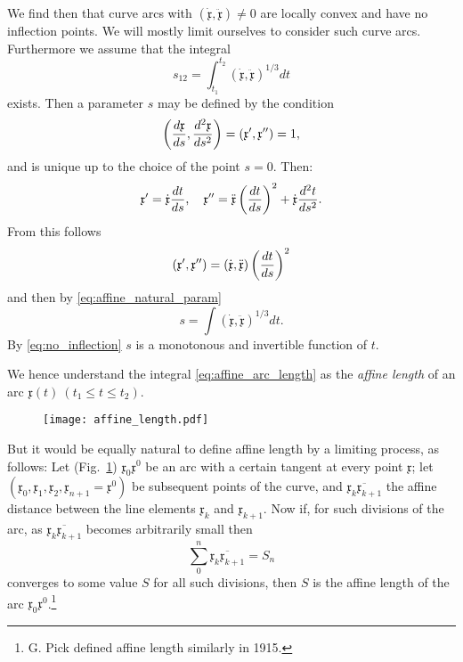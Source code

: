 \documentclass[11pt]{book} \usepackage{amssymb}
\newcommand{\myvec}[1]{\mathfrak{#1}}
\newcommand{\vecx}{\myvec{x}}
\newcommand{\vecderiv}[1]{\dot{\myvec{#1}}}
\newcommand{\vecderivv}[1]{\ddot{\myvec{#1}}}
\begin{document}
We find then that curve arcs with $(\vecderiv{x},\vecderivv{x})\neq 0$ are 
locally convex and have no inflection points. We will mostly limit ourselves
to consider such curve arcs. Furthermore we assume that the integral
\begin{equation}
  \label{eq:affine_arc_length}
  s_{12}=\int_{t_1}^{t_2}(\vecderiv{x},\vecderivv{x})^{1/3}dt
\end{equation}
exists. Then a parameter $s$ may be defined by the condition
\begin{equation}
  \label{eq:affine_natural_param}
  \left({d\vecx\over ds},{d^2\vecx\over ds^2}\right)=
  (\vecx',\vecx'')=1,
\end{equation}
and is unique up to the choice of the point $s=0$. Then:
\begin{equation}
  \label{eq:param_transform}
  \vecx'=\vecderiv{x}{dt\over ds},\quad 
  \vecx''=\vecderivv{x}\left({dt\over ds}\right)^2+\vecderiv{x}{d^2t\over ds^2}.
\end{equation}
From this follows
\begin{equation}
  \label{eq:affine_deriv_transform1}
  (\vecx',\vecx'')=(\vecderiv{x},\vecderivv{x})\left({}dt\over ds\right)^2
\end{equation}
and then by \eqref{eq:affine_natural_param}
\begin{equation}
  \label{eq:affine_arc_length2}
  s=\int(\vecderiv{x},\vecderivv{x})^{1/3}dt.
\end{equation}
By \eqref{eq:no_inflection} $s$ is a monotonous and invertible function of $t$.

We hence understand the integral \eqref{eq:affine_arc_length} as the 
{\em affine length} of an arc $\vecx(t)\:(t_1\leq t \leq t_2)$.

\begin{figure}[htp]
  \centering
  \texttt{[image: affine\_length.pdf]}
  \caption{}
  \label{fig:affine_length}
\end{figure}

But it would be equally natural to define affine length by a limiting process, 
as follows: Let (Fig.~\ref{fig:affine_length}) $\vecx_0\vecx^0$ be an
arc with a certain tangent at every point $\vecx$; let 
$(\vecx_0,\vecx_1,\vecx_2,\vecx_{n+1}=\vecx^0)$ be subsequent points of the
curve, and $\overline{\vecx_k\vecx_{k+1}}$ the affine distance between the line
elements $\vecx_k$ and $\vecx_{k+1}$. Now if, for such divisions of the arc, 
as $\overline{\vecx_k\vecx_{k+1}}$ becomes arbitrarily small then
\begin{equation}
  \label{eq:affine_length_limit}
  \sum_0^n\overline{\vecx_k\vecx_{k+1}}=S_n
\end{equation}
converges to some value $S$ for all such divisions, then $S$ is the affine 
length of the 
arc $\vecx_0\vecx^0$.\footnote{G. Pick defined affine length similarly in 1915.}
\end{document}
